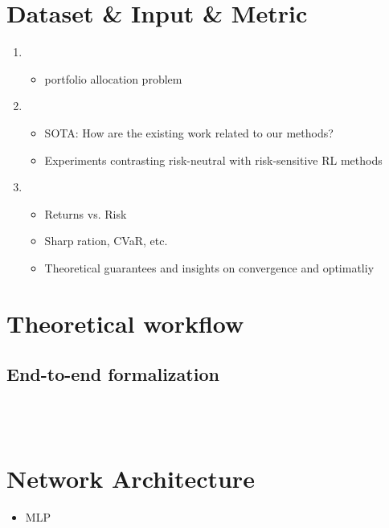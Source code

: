 \section{Dataset \& Input \& Metric}
\begin{enumerate}
\item
	\begin{itemize}
	\item
	portfolio allocation problem
	\end{itemize}

\item
	\begin{itemize}
	\item
	SOTA: How are the existing work related to our methods? 
	\item
	Experiments contrasting risk-neutral with risk-sensitive RL methods
	\end{itemize}
\item
	\begin{itemize}
	\item
	Returns vs. Risk
	\item
	Sharp ration, CVaR, etc.
	\item
	Theoretical guarantees and insights on convergence and optimatliy
	\end{itemize}
\end{enumerate}

\section{Theoretical workflow}
\subsection{End-to-end formalization}

~\\
~\\

\section{Network Architecture}
\begin{itemize}
\item
MLP
\end{itemize}


\def\FormatName#1{#1}

{\footnotesize}


